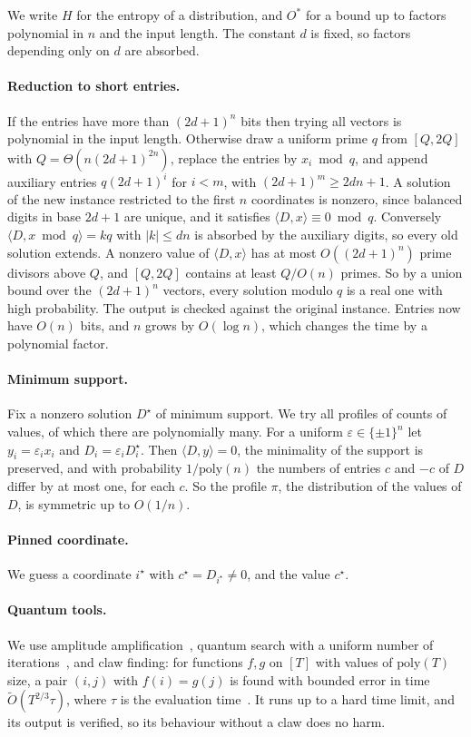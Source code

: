 \documentclass[11pt]{article}
\theoremstyle{remark}
\newcommand{\Ot}{\tilde O}
\newcommand{\ip}[2]{\langle #1,#2\rangle}
\begin{document}
We write $H$ for the entropy of a distribution, and $O^*$ for a bound up to factors polynomial in $n$ and the input length. The constant $d$ is fixed, so factors depending only on $d$ are absorbed.

\paragraph{Reduction to short entries.} If the entries have more than $(2d+1)^n$ bits then trying all vectors is polynomial in the input length. Otherwise draw a uniform prime $q$ from $[Q,2Q]$ with $Q=\Theta(n(2d+1)^{2n})$, replace the entries by $x_i\bmod q$, and append auxiliary entries $q(2d+1)^i$ for $i<m$, with $(2d+1)^m\ge2dn+1$. A solution of the new instance restricted to the first $n$ coordinates is nonzero, since balanced digits in base $2d+1$ are unique, and it satisfies $\ip Dx\equiv0\bmod q$. Conversely $\ip D{x\bmod q}=kq$ with $|k|\le dn$ is absorbed by the auxiliary digits, so every old solution extends. A nonzero value of $\ip Dx$ has at most $O((2d+1)^n)$ prime divisors above $Q$, and $[Q,2Q]$ contains at least $Q/O(n)$ primes. So by a union bound over the $(2d+1)^n$ vectors, every solution modulo $q$ is a real one with high probability. The output is checked against the original instance. Entries now have $O(n)$ bits, and $n$ grows by $O(\log n)$, which changes the time by a polynomial factor.

\paragraph{Minimum support.} Fix a nonzero solution $D^\star$ of minimum support. We try all profiles of counts of values, of which there are polynomially many. For a uniform $\varepsilon\in\{\pm1\}^n$ let $y_i=\varepsilon_ix_i$ and $D_i=\varepsilon_iD_i^\star$. Then $\ip Dy=0$, the minimality of the support is preserved, and with probability $1/\mathrm{poly}(n)$ the numbers of entries $c$ and $-c$ of $D$ differ by at most one, for each $c$. So the profile $\pi$, the distribution of the values of $D$, is symmetric up to $O(1/n)$.

\paragraph{Pinned coordinate.} We guess a coordinate $i^\star$ with $c^\star=D_{i^\star}\ne0$, and the value $c^\star$.

\paragraph{Quantum tools.} We use amplitude amplification~\cite{BHMT02}, quantum search with a uniform number of iterations~\cite{BBHT98}, and claw finding: for functions $f,g$ on $[T]$ with values of $\mathrm{poly}(T)$ size, a pair $(i,j)$ with $f(i)=g(j)$ is found with bounded error in time $\Ot(T^{2/3}\tau)$, where $\tau$ is the evaluation time~\cite{Tan09,Amb07}. It runs up to a hard time limit, and its output is verified, so its behaviour without a claw does no harm.
\end{document}

